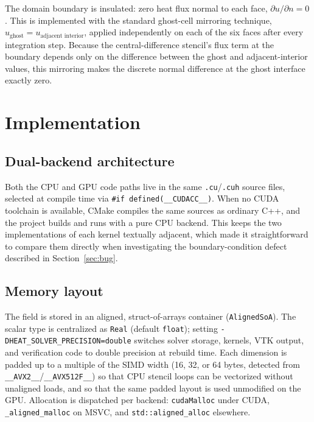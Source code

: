 \documentclass[conference]{IEEEtran}
\begin{document}
The domain boundary is insulated: zero heat flux normal to each face,
$\partial u/\partial n = 0$. This is implemented with the standard ghost-cell mirroring
technique, $u_{\text{ghost}} = u_{\text{adjacent interior}}$, applied independently on
each of the six faces after every integration step. Because the central-difference
stencil's flux term at the boundary depends only on the difference between the ghost
and adjacent-interior values, this mirroring makes the discrete normal difference at
the ghost interface exactly zero.

\section{Implementation}

\subsection{Dual-backend architecture}

Both the CPU and GPU code paths live in the same \texttt{.cu}/\texttt{.cuh} source
files, selected at compile time via \texttt{\#if defined(\_\_CUDACC\_\_)}. When no CUDA
toolchain is available, CMake compiles the same sources as ordinary C++, and the
project builds and runs with a pure CPU backend. This keeps the two implementations of
each kernel textually adjacent, which made it straightforward to compare them
directly when investigating the boundary-condition defect described in
Section~\ref{sec:bug}.

\subsection{Memory layout}

The field is stored in an aligned, struct-of-arrays container (\texttt{AlignedSoA}).
The scalar type is centralized as \texttt{Real} (default \texttt{float}); setting
\texttt{-DHEAT\_SOLVER\_PRECISION=double} switches solver storage, kernels, VTK
output, and verification code to double precision at rebuild time.
Each dimension is padded up to a multiple of the SIMD width (16, 32, or 64 bytes,
detected from \texttt{\_\_AVX2\_\_}/\texttt{\_\_AVX512F\_\_}) so that CPU stencil loops
can be vectorized without unaligned loads, and so that the same padded layout is used
unmodified on the GPU. Allocation is dispatched per backend: \texttt{cudaMalloc} under
CUDA, \texttt{\_aligned\_malloc} on MSVC, and \texttt{std::aligned\_alloc} elsewhere.
\end{document}
